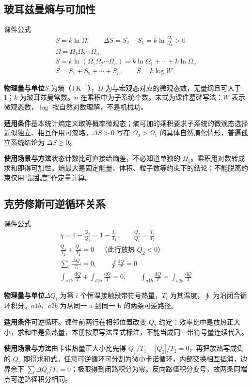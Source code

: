 \documentclass[UTF8,fontset=none,zihao=-4,a4paper]{ctexart}
\newcommand{\explain}[3]{\par\noindent\textbf{物理量与单位}\quad #1\par
\noindent\textbf{适用条件}\quad #2\par
\noindent\textbf{使用场景与方法}\quad #3\par}
\begin{document}
\par\noindent\begin{minipage}{\linewidth}
\subsection{玻耳兹曼熵与可加性}
\begin{infobox}[breakable=false]{课件公式}
\begin{gather*}S=k\ln\Omega,\qquad\Delta S=S_2-S_1=k\ln\frac{\Omega_2}{\Omega_1}>0\\\Omega=\Omega_1\Omega_2\cdots\Omega_n\\S=k\ln(\Omega_1\Omega_2\cdots\Omega_n)=k\ln\Omega_1+\cdots+k\ln\Omega_n\\S=S_1+S_2+\cdots+S_n,\qquad S=k\log W\end{gather*}
\end{infobox}
\end{minipage}\par
\explain{$S$ 为熵（$\mathrm{J\,K^{-1}}$），$\Omega$ 为与宏观态对应的微观态数，无量纲且可大于 1；$k$ 为玻耳兹曼常数。$n$ 在乘积中为子系统个数。末式为课件墓碑写法：$W$ 表示微观态数，$\log$ 按自然对数理解，不是机械功。}{基本统计熵定义取等概率微观态；熵可加的乘积要求子系统的微观态选择近似独立、相互作用可忽略。$\Delta S>0$ 写在 $\Omega_2>\Omega_1$ 的具体自然演化情形，普遍孤立系统结论为 $\Delta S\ge0$。}{状态计数比可直接给熵差，不必知道单独的 $\Omega_1$。乘积用对数转成求和即得可加性。熵最大是固定能量、体积、粒子数等约束下的结论；不能脱离约束仅用“混乱度”作定量计算。}


\par\noindent\begin{minipage}{\linewidth}
\subsection{克劳修斯可逆循环关系}
\begin{infobox}[breakable=false]{课件公式}
\begin{gather*}\eta=1-\frac{Q_2}{Q_1}=1-\frac{T_2}{T_1},\qquad\frac{Q_2}{Q_1}=\frac{T_2}{T_1}\\\frac{Q_1}{T_1}+\frac{Q_2}{T_2}=0\quad\text{（此行放热 }Q_2<0\text{）}\\\sum_i\frac{\Delta Q_i}{T_i}=0,\qquad\oint\frac{\mathrm dQ}T=0\\\int_{a1b}\frac{\mathrm dQ}T+\int_{b2a}\frac{\mathrm dQ}T=0,\qquad\int_{a1b}\frac{\mathrm dQ}T=\int_{a2b}\frac{\mathrm dQ}T\end{gather*}
\end{infobox}
\end{minipage}\par
\explain{$\Delta Q_i$ 为第 $i$ 个恒温接触段带符号热量，$T_i$ 为其温度，$\oint$ 为沿闭合循环积分。$a1b$、$a2b$ 为从同一 a 到同一 b 的两条可逆路径。}{可逆循环。课件前两行在相邻位置改变 $Q_2$ 约定：效率比中是放热正大小，求和中是负热量，本册按原写法显式标注，不能当成同一带符号量连续代入。}{由卡诺热量正大小比先得 $Q_1/T_1-|Q_2|/T_2=0$，再把放热写成负的 $Q_2$ 即得求和式。任意可逆循环可分割为微小卡诺循环，内部交换相互抵消，边界余下 $\sum\Delta Q_i/T_i=0$；极限得到闭路积分为零。反向路径积分变号，故两条同端点可逆路径积分相同。}
\end{document}
